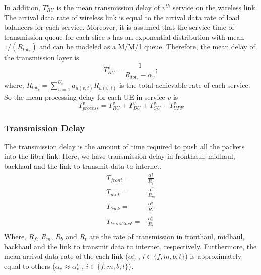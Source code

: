 \documentclass[conference]{IEEEtran}
\begin{document}
In addition, $T_{RU}^{v}$ is the mean transmission delay of $v^{th}$ service on the wireless link. The arrival data rate of wireless link is equal to the arrival data rate of load balancers for each service.
Moreover, it is assumed that the service time of transmission queue for each slice $s$ has
 an exponential distribution with mean $1/(R_{{tot}_v})$ and can be modeled as a M/M/1 queue.
 Therefore,
the mean delay of the transmission layer is
\begin{equation}
 T_{RU}^{v} = \frac{1}{R_{{tot}_v} - \alpha_{v}};
\end{equation}
where, $R_{{tot}_v} = \sum_{u=1}^{U_v}a_{u(v,i)}R_{u(v,i)}$ is the total achievable rate of each service.
So the mean processing delay for each UE in service $v$ is 
\begin{equation}
T_{process}^{v} =  T_{RU}^{v} + T_{DU}^{v} + T_{CU}^{v} + T_{UPF}^{v}
\end{equation}
\subsubsection{Transmission Delay}
The transmission delay is the amount of time required to push all the packets into the fiber link. 
Here, we have transmission delay in fronthaul, midhaul, backhaul and the link to transmit data to internet.
\begin{equation}
\begin{split}
T_{front} =& \frac{\alpha_{v}^{f}}{R_f} \\
T_{mid} =&  \frac{\alpha_{v}^{m}}{R_m} \\
T_{back} =& \frac{\alpha_{v}^{b}}{R_b} \\
T_{trans2net} =& \frac{\alpha_{v}^{t}}{R_t} \\
\end{split}
\end{equation}
Where, $R_f$, $R_m$, $R_b$ and $R_t$ are the rate of transmission in fronthaul, midhaul, backhaul and the link to transmit data to internet, respectively.
Furthermore, the mean arrival data rate of the each link ($\alpha_{v}^i$ , $i \in \{f,m,b,t\}$) is approximately equal to others ($\alpha_{v} \approx \alpha_{v}^i$ , $i \in \{f,m,b,t\}$).  
\end{document}
